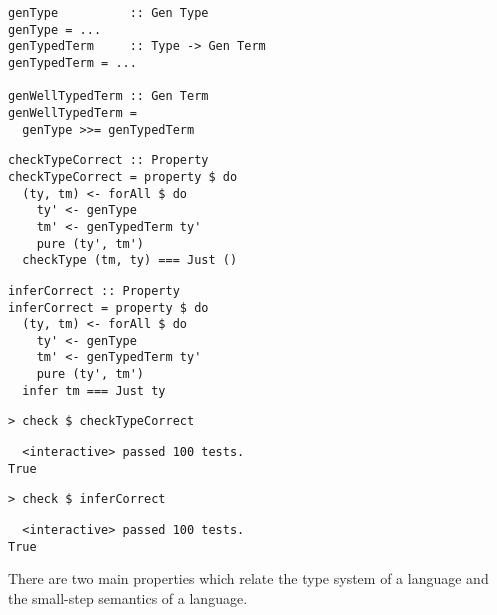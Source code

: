 \begin{frame}[fragile]
  \begin{verbatim}
genType          :: Gen Type
genType = ...
genTypedTerm     :: Type -> Gen Term
genTypedTerm = ...

genWellTypedTerm :: Gen Term
genWellTypedTerm =
  genType >>= genTypedTerm
  \end{verbatim}
\end{frame}

\begin{frame}[fragile]
  \begin{verbatim}
checkTypeCorrect :: Property
checkTypeCorrect = property $ do
  (ty, tm) <- forAll $ do
    ty' <- genType
    tm' <- genTypedTerm ty'
    pure (ty', tm')
  checkType (tm, ty) === Just ()
  \end{verbatim}

  \begin{verbatim}
inferCorrect :: Property
inferCorrect = property $ do
  (ty, tm) <- forAll $ do
    ty' <- genType
    tm' <- genTypedTerm ty'
    pure (ty', tm')
  infer tm === Just ty
  \end{verbatim}
\end{frame}

\begin{frame}[fragile]
  \onslide<+->
  \begin{verbatim}
> check $ checkTypeCorrect
  \end{verbatim}
  \onslide<+->
  \begin{verbatim}
  <interactive> passed 100 tests.
True
  \end{verbatim}
  \onslide<+->
  \begin{verbatim}
> check $ inferCorrect
  \end{verbatim}
  \onslide<+->
  \begin{verbatim}
  <interactive> passed 100 tests.
True
  \end{verbatim}
\end{frame}

\begin{frame}[c]
  There are two main properties which relate the type system of a language and
  the small-step semantics of a language.
\end{frame}

